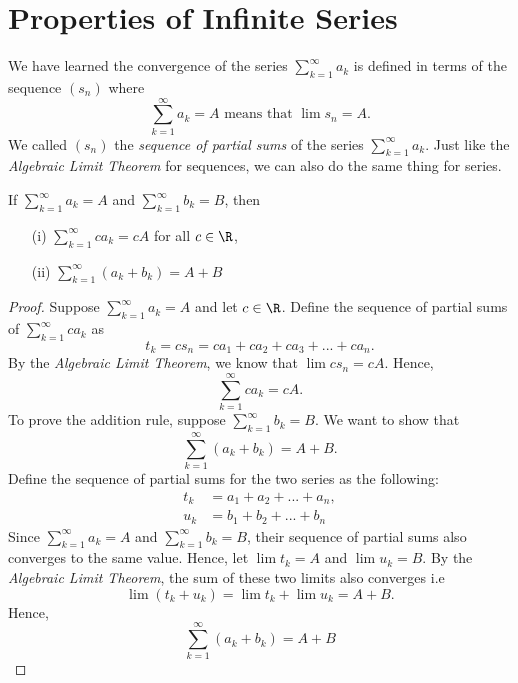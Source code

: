 \section{Properties of Infinite Series}

We have learned the convergence of the series \( \sum_{k=1}^{\infty} a_k \) is defined in terms of the sequence \( (s_n)\) where 
\[ \sum_{k=1}^{\infty} a_k = A \text{ means that } \lim s_n = A.\]
We called \( (s_n)\) the \textit{sequence of partial sums} of the series \( \sum_{k=1}^{\infty} a_k\). Just like the \textit{Algebraic Limit Theorem} for sequences, we can also do the same thing for series. 

\begin{tcolorbox}
    \begin{thm} 
If \( \sum_{k=1}^{ \infty} a_k = A \) and \( \sum_{k=1}^{ \infty} b_k = B \), then 
\begin{enumerate}
    \item[(i)] \( \sum_{k=1}^{ \infty } ca_k = cA \) for all \( c \in \R \),
    \item[(ii)] \( \sum_{k=1}^{ \infty } (a_k + b_k) = A + B\)
\end{enumerate}
\end{thm}
\end{tcolorbox}

\begin{proof}
Suppose \( \sum_{k=1}^{\infty} a_k = A \) and let \( c \in \R \). Define the sequence of partial sums of \( \sum_{k=1}^{ \infty} ca_k \) as 
\[ t_k = cs_n =  ca_1 + ca_2 + ca_3 + ... + ca_n.\]
By the \textit{Algebraic Limit Theorem}, we know that \( \lim cs_n = cA \). Hence, 
\[ \sum_{k=1}^{\infty} ca_k = cA.\]
To prove the addition rule, suppose \( \sum_{k=1}^{ \infty} b_k = B \). We want to show that 
\[ \sum_{k=1}^{\infty} (a_k + b_k) = A + B.\]
Define the sequence of partial sums for the two series as the following:
\begin{align*}
    t_k &= a_1 + a_2 + ... + a_n, \\
    u_k &= b_1 + b_2 + ... + b_n
\end{align*}
Since \( \sum_{k=1}^{\infty} a_k = A \) and \( \sum_{k=1}^{\infty} b_k = B \), their sequence of partial sums also converges to the same value. Hence, let \( \lim t_k = A \) and \( \lim u_k = B \). By the \textit{Algebraic Limit Theorem}, the sum of these two limits also converges i.e  
\[ \lim ( t_k + u_k ) = \lim t_k + \lim u_k = A + B.\] 
Hence, 
\[ \sum_{k=1}^{\infty} (a_k + b_k) = A + B \]
\end{proof}

